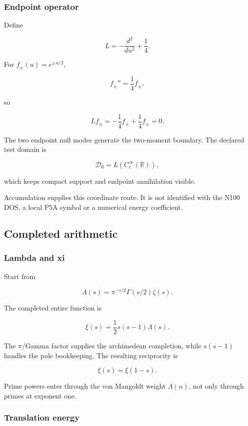 \subsubsection{Endpoint operator}\label{viii-ch09-endpoint-operator}

Define

\[
L=-\frac{d^2}{du^2}+\frac14.
\]

For \(f_\pm(u)=e^{\pm u/2}\),

\[
f_\pm''=\frac14f_\pm,
\]

so

\[
Lf_\pm=-\frac14f_\pm+\frac14f_\pm=0.
\]

The two endpoint null modes generate the two-moment boundary. The
declared test domain is

\[
\mathcal D_0=L(C_c^\infty(\mathbb R)),
\]

which keeps compact support and endpoint annihilation visible.

Accumulation supplies this coordinate route. It is not identified with
the N100 DOS, a local P5A symbol or a numerical energy coefficient.

\subsection{Completed arithmetic}\label{viii-ch09-completed-arithmetic}

\subsubsection{Lambda and xi}\label{viii-ch09-lambda-and-xi}

Start from

\[
\Lambda(s)=\pi^{-s/2}\Gamma(s/2)\zeta(s).
\]

The completed entire function is

\[
\xi(s)=\frac12s(s-1)\Lambda(s).
\]

The \ensuremath{\pi}/Gamma factor supplies the archimedean completion, while \(s(s-1)\)
handles the pole bookkeeping. The resulting reciprocity is

\[
\xi(s)=\xi(1-s).
\]

Prime powers enter through the von Mangoldt weight \(\Lambda(n)\), not
only through primes at exponent one.

\subsubsection{Translation energy}\label{viii-ch09-translation-energy}


